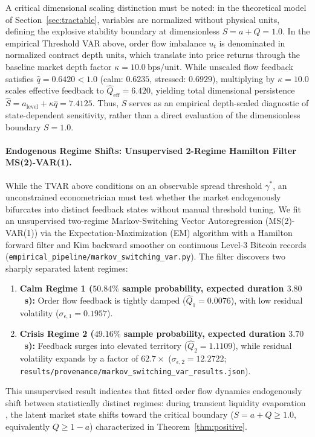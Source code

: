 \documentclass[10pt,twocolumn,letterpaper]{article}
\theoremstyle{definition}
\theoremstyle{remark}
\begin{document}
A critical dimensional scaling distinction must be noted: in the theoretical model of Section~\ref{sec:tractable}, variables are normalized without physical units, defining the explosive stability boundary at dimensionless $S = a + Q = 1.0$. In the empirical Threshold VAR above, order flow imbalance $u_t$ is denominated in normalized contract depth units, which translate into price returns through the baseline market depth factor $\kappa = 10.0~\text{bps}/\text{unit}$. While unscaled flow feedback satisfies $\hat{q} = 0.6420 < 1.0$ (calm: $0.6235$, stressed: $0.6929$), multiplying by $\kappa = 10.0$ scales effective feedback to $\hat{Q}_{\text{eff}} = 6.420$, yielding total dimensional persistence $\hat{S} = a_{\text{level}} + \kappa \hat{q} = 7.4125$. Thus, $\hat{S}$ serves as an empirical depth-scaled diagnostic of state-dependent sensitivity, rather than a direct evaluation of the dimensionless boundary $S=1.0$.

\paragraph{Endogenous Regime Shifts: Unsupervised 2-Regime Hamilton Filter MS(2)-VAR(1).}
While the TVAR above conditions on an observable spread threshold $\gamma^*$, an unconstrained econometrician must test whether the market endogenously bifurcates into distinct feedback states without manual threshold tuning. We fit an unsupervised two-regime Markov-Switching Vector Autoregression (MS(2)-VAR(1)) via the Expectation-Maximization (EM) algorithm with a Hamilton forward filter and Kim backward smoother on continuous Level-3 Bitcoin records (\texttt{empirical\_pipeline/markov\_switching\_var.py}).
The filter discovers two sharply separated latent regimes:
\begin{enumerate}
    \item \textbf{Calm Regime 1 ($50.84\%$ sample probability, expected duration $3.80$~s):} Order flow feedback is tightly damped ($\hat Q_1 = 0.0076$), with low residual volatility ($\sigma_{\epsilon, 1} = 0.1957$).
    \item \textbf{Crisis Regime 2 ($49.16\%$ sample probability, expected duration $3.70$~s):} Feedback surges into elevated territory ($\hat Q_2 = 1.1109$), while residual volatility expands by a factor of \textbf{$62.7\times$} ($\sigma_{\epsilon, 2} = 12.2722$; \texttt{results/provenance/markov\_switching\_var\_results.json}).
\end{enumerate}
This unsupervised result indicates that fitted order flow dynamics endogenously shift between statistically distinct regimes: during transient liquidity evaporation \citep{bouchaud2004fluctuations,brunnermeier2009,cont2010stochastic}, the latent market state shifts toward the critical boundary ($S = a + Q \ge 1.0$, equivalently $Q \ge 1 - a$) characterized in Theorem~\ref{thm:positive}.
\end{document}
